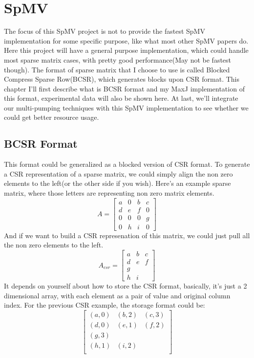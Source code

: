 \documentclass[a4paper, 10pt]{report}
\begin{document}
\chapter{SpMV}
The focus of this SpMV project is not to provide the fastest SpMV implementation for some specific purpose, like what most other SpMV papers do. Here this project will have a general purpose implementation, which could handle most sparse matrix cases, with pretty good performance(May not be fastest though). The format of sparse matrix that I choose to use is called Blocked Compress Sparse Row(BCSR), which generates blocks upon CSR format. This chapter I'll first describe what is BCSR format and my MaxJ implementation of this format, experimental data will also be shown here. At last, we'll integrate our multi-pumping techniques with this SpMV implementation to see whether we could get better resource usage.

\section{BCSR Format}
This format could be generalized as a blocked version of CSR format. To generate a CSR representation of a sparse matrix, we could simply align the non zero elements to the left(or the other side if you wish). Here's an example sparse matrix, where those letters are representing non zero matrix elements.
\[
A = 
\begin{bmatrix}
	a & 0 & b & c \\
	d & e & f & 0 \\
	0 & 0 & 0 & g \\
	0 & h & i & 0
\end{bmatrix}
\]
And if we want to build a CSR represenation of this matrix, we could just pull all the non zero elements to the left. 
$$A_{csr} = 
\begin{bmatrix}
	a & b & c \\
	d & e & f \\
	g \\
	h & i
\end{bmatrix}
$$
It depends on yourself about how to store the CSR format, basically, it's just a 2 dimensional array, with each element as a pair of value and original column index. For the previous CSR example, the storage format could be: 
$$
\begin{bmatrix}
	(a,0) & (b,2) & (c,3) \\
	(d,0) & (e,1) & (f,2) \\
	(g,3) \\
	(h,1) & (i,2) \\
\end{bmatrix}
$$
\end{document}
